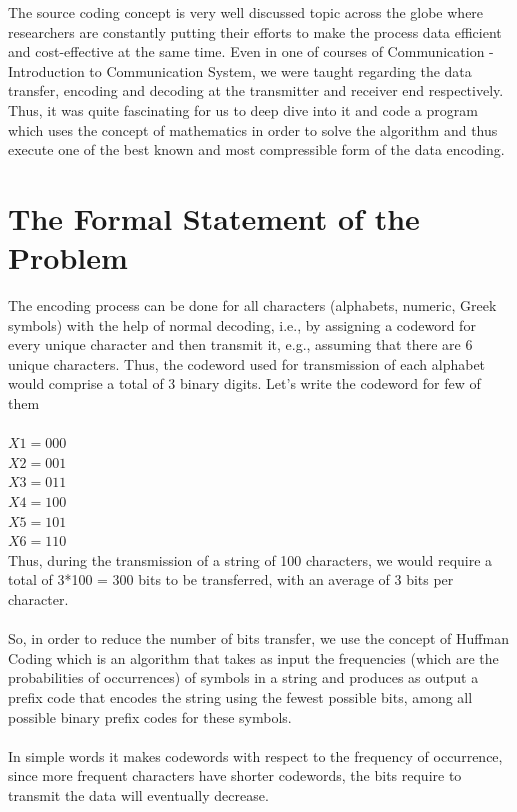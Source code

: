 \documentclass{article}
\begin{document}
\Large{The source coding concept is very well discussed topic across the globe where researchers are constantly putting their efforts to make the process data efficient and cost-effective at the same time. Even in one of courses of Communication - Introduction to Communication System, we were taught regarding the data transfer, encoding and decoding at the transmitter and receiver end respectively. Thus, it was quite fascinating for us to deep dive into it and code a program which uses the concept of mathematics in order to solve the algorithm and thus execute one of the best known and most compressible form of the data encoding.}\\

\vspace{1cm}

\section{The Formal Statement of the Problem}

\Large{The encoding process can be done for all characters (alphabets, numeric, Greek symbols) with the help of normal decoding, i.e., by assigning a codeword for every unique character and then transmit it, e.g., assuming that there are 6 unique characters. Thus, the codeword used for transmission of each alphabet would comprise a total of 3 binary digits. Let’s write the codeword for few of them}\\ \\
$X1 = 000$\\
$X2 = 001$\\
$X3 = 011$\\
$X4 = 100$\\
$X5 = 101$\\
$X6 = 110$\\

\Large{Thus, during the transmission of a string of 100 characters, we would require a total of 3*100 = 300 bits to be transferred, with an average of 3 bits per character.\\ \\
So, in order to reduce the number of bits transfer, we use the concept of Huffman Coding which is an algorithm that takes as input the frequencies (which are the probabilities of occurrences) of symbols in a string and produces as output a prefix code that encodes the string using the fewest possible bits, among all possible binary prefix codes for these symbols. \\ \\
In simple words it makes codewords with respect to the frequency of occurrence, since more frequent characters have shorter codewords, the bits require to transmit the data will eventually decrease.} \\
\end{document}
